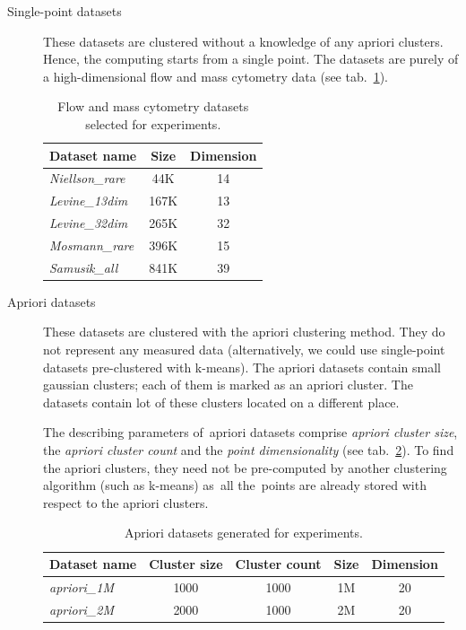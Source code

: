 \begin{description}
	\item[Single-point datasets] These datasets are clustered without a knowledge of any apriori clusters. Hence, the computing starts from a single point. The datasets are purely of a high-dimensional flow and mass cytometry data \cite{flowrepo} (see tab.~\ref{tab04:single}).
	
	\begin{table}
		\centering
		\begin{tabular}{lcc}
			\toprule
			\textbf{Dataset name} & \textbf{Size} & \textbf{Dimension} \\ \midrule
			\emph{Niellson\_rare} &      44K      &         14         \\
			\emph{Levine\_13dim}  &     167K      &         13         \\
			\emph{Levine\_32dim}  &     265K      &         32         \\
			\emph{Mosmann\_rare}  &     396K      &         15         \\
			\emph{Samusik\_all}   &     841K      &         39         \\ \bottomrule
		\end{tabular}
	\caption{Flow and mass cytometry datasets selected for experiments.}
	\label{tab04:single}
	\end{table}

	\item[Apriori datasets] These datasets are clustered with the apriori clustering me\-thod. 
	They do not represent any measured data (alternatively, we could use single-point data\-sets pre-clustered with k-means). The apriori datasets contain small gaussian clusters; each of them is marked as an apriori cluster. The datasets contain lot of these clusters located on a different place. 
	
	The describing parameters of~apriori datasets comprise \emph{apriori cluster size}, the \emph{apriori cluster count} and the \emph{point dimensionality} (see tab.~\ref{tab04:apriori}). To find the apriori clusters, they need not be pre-computed by another clustering algorithm (such as k-means) as~all the~points are already stored with respect to the apriori clusters.
	
	\begin{table}
		\centering
		\begin{tabular}{lcccc}
			\toprule
			\textbf{Dataset name} & \textbf{Cluster size} & \textbf{Cluster count} & \textbf{Size} & \textbf{Dimension} \\ \midrule
			\emph{apriori\_1M}    &         1000          &          1000          &      1M       &         20         \\
			\emph{apriori\_2M}    &         2000          &          1000          &      2M       &         20         \\ \bottomrule
		\end{tabular}
		\caption{Apriori datasets generated for experiments.}
		\label{tab04:apriori}
	\end{table}
	
\end{description}

